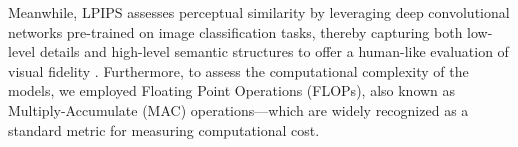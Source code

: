 \documentclass[a4paper,fleqn]{ieeetj}
\begin{document}
Meanwhile, LPIPS assesses perceptual similarity by leveraging deep convolutional networks pre-trained on image classification tasks, thereby capturing both low-level details and high-level semantic structures to offer a human-like evaluation of visual fidelity \cite{cheng2021perceptual}. Furthermore, to assess the computational complexity of the models, we employed Floating Point Operations (FLOPs), also known as Multiply-Accumulate (MAC) operations—which are widely recognized as a standard metric for measuring computational cost.

\end{document}
